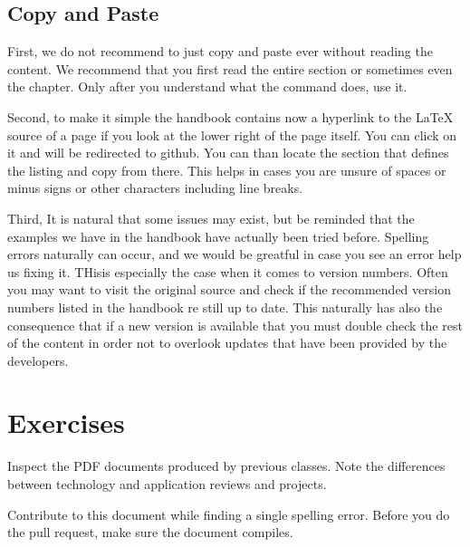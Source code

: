 
\subsection{Copy and Paste}


First, we do not recommend to just copy and paste ever without reading
the content. We recommend that you first read the entire section or
sometimes even the chapter. Only after you understand what the command
does, use it.

Second, to make it simple the handbook contains now a hyperlink to the
LaTeX source of a page if you look at the lower right of the page
itself. You can click on it and will be redirected to github. You can
than locate the section that defines the listing and copy from
there. This helps in cases you are unsure of spaces or minus signs or
other characters including line breaks.

Third, It is natural that some issues may exist, but be reminded that
the examples we have in the handbook have actually been tried
before. Spelling errors naturally can occur, and we would be greatful
in case you see an error help us fixing it. THisis especially the case
when it comes to version numbers. Often you may want to visit the
original source and check if the recommended version numbers listed in
the handbook re still up to date. This naturally has also the
consequence that if a new version is available that you must double
check the rest of the content in order not to overlook updates that
have been provided by the developers.



\section{Exercises}
\bigskip

\begin{exercise}
\label{E:Preface.1} 
Inspect the PDF documents produced by previous
classes. Note the differences between technology and application
reviews and projects. 
\end{exercise}

\begin{exercise}
\label{E:Preface.2}
 Contribute to this document while finding a
  single spelling error. Before you do the pull request, make sure the
  document compiles.
\end{exercise}



